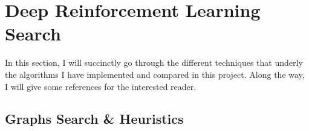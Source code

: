 
\chapter{Deep Reinforcement Learning Search} %

\label{Chapter1} %

In this section, I will succinctly go through the different techniques that underly the algorithms I have implemented and compared in this project. Along the way, I will give some references for the interested reader.



\section{Graphs Search \& Heuristics}

\label{GSH}



